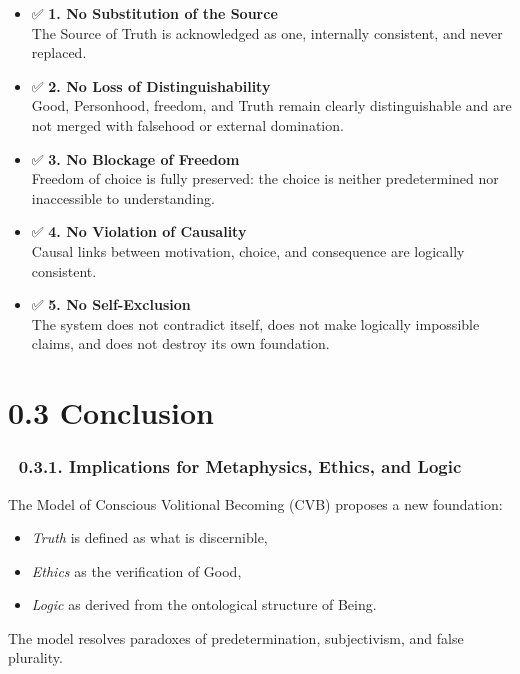 \documentclass[12pt]{article}
\begin{document}
\begin{itemize}
\item ✅ \textbf{1. No Substitution of the Source}\\
The Source of Truth is acknowledged as one, internally consistent, and never replaced.

\item ✅ \textbf{2. No Loss of Distinguishability}\\
Good, Personhood, freedom, and Truth remain clearly distinguishable and are not merged with falsehood or external domination.

\item ✅ \textbf{3. No Blockage of Freedom}\\
Freedom of choice is fully preserved: the choice is neither predetermined nor inaccessible to understanding.

\item ✅ \textbf{4. No Violation of Causality}\\
Causal links between motivation, choice, and consequence are logically consistent.

\item ✅ \textbf{5. No Self-Exclusion}\\
The system does not contradict itself, does not make logically impossible claims, and does not destroy its own foundation.
\end{itemize}

\section*{0.3 Conclusion}

\subsubsection*{🔹 0.3.1. Implications for Metaphysics, Ethics, and Logic}

The Model of Conscious Volitional Becoming (CVB) proposes a new foundation:

\begin{itemize}
\item \textit{Truth} is defined as what is discernible,
\item \textit{Ethics} as the verification of Good,
\item \textit{Logic} as derived from the ontological structure of Being.
\end{itemize}

The model resolves paradoxes of predetermination, subjectivism, and false plurality.
\end{document}
